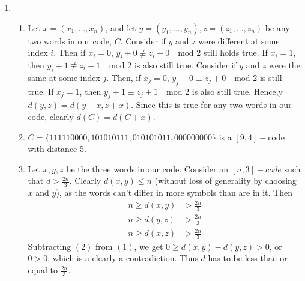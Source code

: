 \documentclass[10pt,english]{article}
\begin{document}
\begin{enumerate}
\pagebreak
\item \begin{enumerate}
    \item Let $x=(x_1,\ldots,x_n)$, and let $y=(y_1,\ldots,y_n), z=(z_1,\ldots,z_n)$ be any two words in our code, $C$. Consider if $y$ and $z$ were different at some index $i$. Then if $x_i=0$, $y_i+0\not\equiv z_i+0\quad\text{mod }2$ still holds true. If $x_i=1$, then $y_i+1\not\equiv z_i+1\quad\text{mod }2$ is also still true. Consider if $y$ and $z$ were the same at some index $j$. Then, if $x_j=0$, $y_j+0\equiv z_j+0\quad\text{mod }2$ is still true. If $x_j=1$, then $y_j+1\equiv z_j+1\quad\text{mod }2$ is also still true. Hence,y $d(y,z)=d(y+x,z+x)$. Since this is true for any two words in our code, clearly $d(C)=d(C+x)$. 
    
    
    \item $C=\{111110000,101010111,010101011,000000000\}$ is a $[9,4]-$code with distance 5.

    \item Let $x,y,z$ be the three words in our code. Consider an $[n,3]-code$ such that $d>\frac{2n}{3}$. Clearly $d(x,y)\leq n$ (without loss of generality by choosing $x$ and $y$), as the words can't differ in more symbols than are in it. Then 
    \begin{align}
    n\geq d(x,y)&>\frac{2n}{3}\\ 
    n\geq d(y,z)&>\frac{2n}{3}\\ 
    n\geq d(x,z)&>\frac{2n}{3} 
    \end{align}
    Subtracting $(2)$ from $(1)$, we get $0\geq d(x,y)-d(y,z)>0$, or $0>0$, which is a clearly a contradiction. Thus $d$ has to be less than or equal to $\frac{2n}{3}$.
    
    
    
\end{enumerate}
\end{enumerate}
\end{document}
